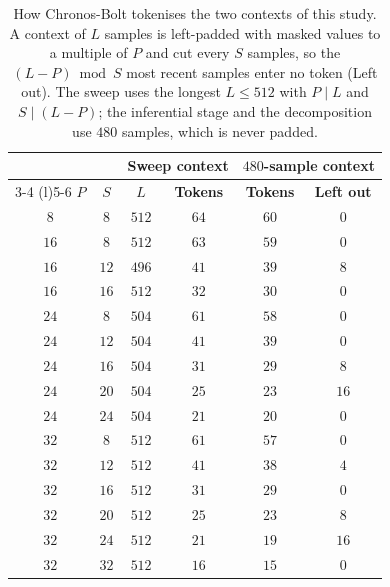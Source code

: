 \begin{table}[!tbp]
    \centering
    \small
    \renewcommand{\arraystretch}{1.1}
    \begin{tabular}{@{}cccccc@{}}
        \toprule
        & & \multicolumn{2}{c}{\textbf{Sweep context}} & \multicolumn{2}{c}{\textbf{$480$-sample context}} \\
        \cmidrule(lr){3-4} \cmidrule(l){5-6}
        \textbf{$P$} & \textbf{$S$} & \textbf{$L$} & \textbf{Tokens} & \textbf{Tokens} & \textbf{Left out} \\
        \midrule
        $8$ & $8$ & $512$ & $64$ & $60$ & $0$ \\
        \midrule
        $16$ & $8$ & $512$ & $63$ & $59$ & $0$ \\
        $16$ & $12$ & $496$ & $41$ & $39$ & $8$ \\
        $16$ & $16$ & $512$ & $32$ & $30$ & $0$ \\
        \midrule
        $24$ & $8$ & $504$ & $61$ & $58$ & $0$ \\
        $24$ & $12$ & $504$ & $41$ & $39$ & $0$ \\
        $24$ & $16$ & $504$ & $31$ & $29$ & $8$ \\
        $24$ & $20$ & $504$ & $25$ & $23$ & $16$ \\
        $24$ & $24$ & $504$ & $21$ & $20$ & $0$ \\
        \midrule
        $32$ & $8$ & $512$ & $61$ & $57$ & $0$ \\
        $32$ & $12$ & $512$ & $41$ & $38$ & $4$ \\
        $32$ & $16$ & $512$ & $31$ & $29$ & $0$ \\
        $32$ & $20$ & $512$ & $25$ & $23$ & $8$ \\
        $32$ & $24$ & $512$ & $21$ & $19$ & $16$ \\
        $32$ & $32$ & $512$ & $16$ & $15$ & $0$ \\
        \bottomrule
    \end{tabular}
\caption{How Chronos-Bolt tokenises the two contexts of this study. A context of $L$ samples is left-padded with masked values to a multiple of $P$ and cut every $S$ samples, so the $(L-P)\bmod S$ most recent samples enter no token (Left out). The sweep uses the longest $L\le512$ with $P\mid L$ and $S\mid(L-P)$; the inferential stage and the decomposition use $480$ samples, which is never padded.}%
    \label{tab:sweepContext}
\end{table}
